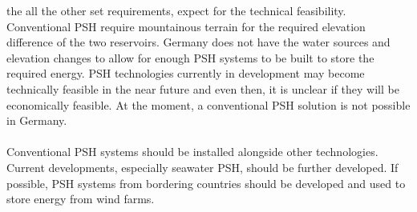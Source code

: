 \begin{parcolumns}[colwidths={1=2.5 cm, 2=10 cm, 3=2.5cm}]{3}
{the all the other set requirements, expect for the technical feasibility. Conventional PSH require mountainous terrain for the required elevation difference of the two reservoirs. Germany does not have the water sources and elevation changes to allow for enough PSH systems to be built to store the required energy. PSH technologies currently in development may become technically feasible in the near future and even then, it is unclear if they will be economically feasible. At the moment, a conventional PSH solution is not possible in Germany.\\ \\
\noindent
Conventional PSH systems should be installed alongside other technologies. Current developments, especially seawater PSH, should be further developed. If possible, PSH systems from bordering countries should be developed and used to store energy from wind farms.
	}


\end{parcolumns}
